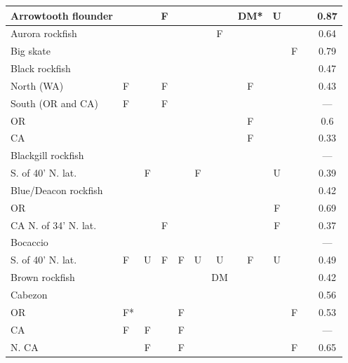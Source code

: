 \documentclass[11pt,
  english,
  a4paper,
]{article}
\begin{document}
\begin{landscape}
\begin{longtable}[t]{>{\raggedright\arraybackslash}p{6cm}lcccccccccc}
\endfoot
\bottomrule
\endlastfoot
Arrowtooth flounder &  &  & F &  &  &  & DM* & U &  &  & 0.87\\
\midrule
Aurora rockfish &  &  &  &  &  & F &  &  &  &  & 0.64\\
\midrule
Big skate &  &  &  &  &  &  &  &  & F &  & 0.79\\
\midrule
Black rockfish &  &  &  &  &  &  &  &  &  &  & 0.47\\
\midrule
\hspace{3mm}North (WA) & F &  & F &  &  &  & F &  &  &  & 0.43\\
\midrule
\hspace{3mm}South (OR and CA) & F &  & F &  &  &  &  &  &  &  & ---\\
\midrule
\hspace{3mm}OR &  &  &  &  &  &  & F &  &  &  & 0.6\\
\midrule
\hspace{3mm}CA &  &  &  &  &  &  & F &  &  &  & 0.33\\
\midrule
Blackgill rockfish &  &  &  &  &  &  &  &  &  &  & ---\\
\midrule
\hspace{3mm}S. of 40\textdegree 10' N. lat. &  & F &  &  & F &  &  & U &  &  & 0.39\\
\midrule
Blue/Deacon rockfish &  &  &  &  &  &  &  &  &  &  & 0.42\\
\midrule
\hspace{3mm}OR &  &  &  &  &  &  &  & F &  &  & 0.69\\
\midrule
\hspace{3mm}CA N. of 34\textdegree 47' N. lat. &  &  & F &  &  &  &  & F &  &  & 0.37\\
\midrule
Bocaccio &  &  &  &  &  &  &  &  &  &  & ---\\
\midrule
\hspace{3mm}S. of 40\textdegree 10' N. lat. & F & U & F & F & U & U & F & U &  &  & 0.49\\
\midrule
Brown rockfish &  &  &  &  &  & DM &  &  &  &  & 0.42\\
\midrule
Cabezon &  &  &  &  &  &  &  &  &  &  & 0.56\\
\midrule
\hspace{3mm}OR & F* &  &  & F &  &  &  &  & F &  & 0.53\\
\midrule
\hspace{3mm}CA & F & F &  & F &  &  &  &  &  &  & ---\\
\midrule
\hspace{3mm}N. CA &  & F &  & F &  &  &  &  & F &  & 0.65\\

\end{longtable}
\end{landscape}
\end{document}
